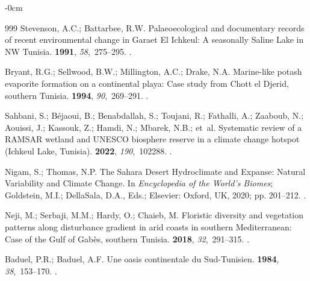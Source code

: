 \documentclass[land,article,accept,pdftex,moreauthors]{Definitions/mdpi}
\begin{document}
\begin{adjustwidth}{-\extralength}{0cm}
\begin{thebibliography}{999}
Stevenson, A.C.; Battarbee, R.W.
\newblock Palaeoecological and documentary records of recent environmental
  change in Garaet El Ichkeul: A seasonally Saline Lake in NW Tunisia.
 {\bf 1991}, {\em 58},~275--295.
.

Bryant, R.G.; Sellwood, B.W.; Millington, A.C.; Drake, N.A.
\newblock Marine-like potash evaporite formation on a continental playa: Case
  study from Chott el Djerid, southern Tunisia.
 {\bf 1994}, {\em 90},~269--291.
.

Sahbani, S.; Béjaoui, B.; Benabdallah, S.; Toujani, R.; Fathalli, A.; Zaaboub,
  N.; Aouissi, J.; Kassouk, Z.; Hamdi, N.; Mbarek, N.B.;  et~al.
\newblock Systematic review of a RAMSAR wetland and UNESCO biosphere reserve in
  a climate change hotspot (Ichkeul Lake, Tunisia).
 {\bf 2022}, {\em 190},~102288.
.

Nigam, S.; Thomas, N.P.
\newblock The Sahara Desert Hydroclimate and Expanse: Natural Variability and
  Climate Change. In {\em Encyclopedia of the World's Biomes}; Goldstein, M.I.;
  DellaSala, D.A., Eds.; Elsevier: Oxford, UK, 2020; pp. 201--212.
.

Neji, M.; Serbaji, M.M.; Hardy, O.; Chaieb, M.
\newblock Floristic diversity and vegetation patterns along disturbance
  gradient in arid coasts in southern Mediterranean: Case of the Gulf of
  Gabès, southern Tunisia.
 {\bf 2018}, {\em
  32},~291--315.
.

Baduel, P.R.; Baduel, A.F.
\newblock Une oasis continentale du Sud-Tunisien.
 {\bf 1984},
  {\em 38},~153--170.
.


\end{thebibliography}
\end{adjustwidth}
\end{document}
